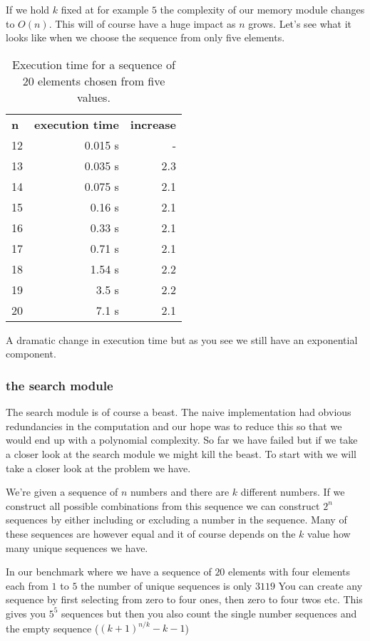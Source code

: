 \documentclass[a4paper,11pt]{article}
\begin{document}
If we hold $k$ fixed at for example $5$ the complexity of our memory
module changes to $O(n)$. This will of course have a huge impact as
$n$ grows. Let's see what it looks like when we choose the sequence
from only five elements.

\begin{table}[h!]
  \begin{center}
    \begin{tabular}{l|r|r}
      \textbf{n} & \textbf{execution time} & \textbf{increase}\\
12	 &0.015 s&- \\ 
13	 &0.035 s&2.3 \\ 
14	 &0.075 s&2.1 \\ 
15	 &0.16 s&2.1 \\ 
16	 &0.33 s&2.1 \\ 
17	 &0.71 s&2.1 \\ 
18	 &1.54 s&2.2 \\ 
19	 &3.5 s&2.2 \\ 
20	 &7.1 s &2.1 \\ 
    \end{tabular}
    \caption{Execution time for a sequence of 20 elements chosen from five values.}
  \end{center}
\end{table}                               

A dramatic change in execution time but as you see we still have an
exponential component. 

\subsubsection*{the search module}

The search module is of course a beast. The naive implementation had
obvious redundancies in the computation and our hope was to reduce
this so that we would end up with a polynomial complexity. So far we
have failed but if we take a closer look at the search module we might
kill the beast. To start with we will take a closer look at the
problem we have.

We're given a sequence of $n$ numbers and there are $k$ different
numbers. If we construct all possible combinations from this sequence
we can construct $2^n$ sequences by either including or excluding a
number in the sequence. Many of these sequences are however equal and
it of course depends on the $k$ value how many unique sequences we
have.

In our benchmark where we have a sequence of $20$ elements with four
elements each from $1$ to $5$ the number of unique sequences is only $3119$ 
You can create any sequence by first selecting from zero to four ones,
then zero to four twos etc. This gives you $5^5$ sequences but then
you also count the single number sequences and the empty sequence ($(k+1)^{n/k} - k - 1$)
\end{document}
